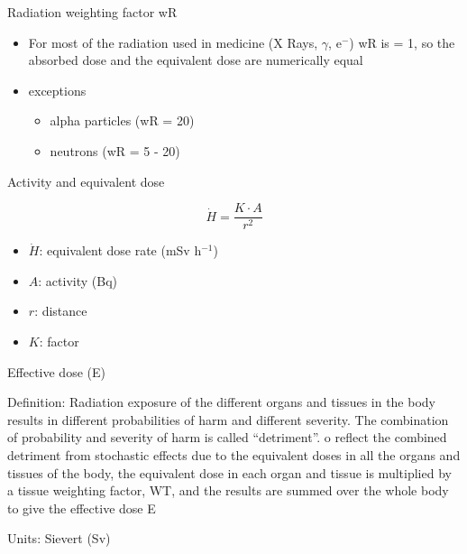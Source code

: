 \begin{frame}{Radiation weighting factor wR}



\begin{itemize}
\item For most of the radiation used in medicine (X Rays, $\gamma$, e$^{-}$) wR is = 1, so the absorbed dose and the equivalent dose are numerically equal
\item exceptions

\begin{itemize}
\item alpha particles (wR = 20) 
\item neutrons (wR = 5 - 20)
\end{itemize}

\end{itemize}



\end{frame}

\begin{frame}{Activity and equivalent dose}


\[\dot{H}=\frac{K\cdot A}{r^2}\]



\begin{itemize}
\item $\dot{H}$: equivalent dose rate (mSv h$^{-1}$)
\item $A$: activity (Bq)
\item $r$: distance
\item $K$: factor 
\end{itemize}


\end{frame}

\begin{frame}{Effective dose (E)}

\alert{Definition}: Radiation exposure of the different organs and tissues in the body results in different probabilities of harm and different severity. The combination of probability and severity of harm is called ``detriment''. o reflect the combined detriment from stochastic effects due to the equivalent doses in all the organs and tissues of the body, the equivalent dose in each organ and tissue is multiplied by a tissue weighting factor, WT, and the results are summed over the whole body to give the effective dose E

\alert{Units}: Sievert (Sv)

\end{frame}

